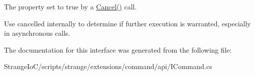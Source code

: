 The property set to true by a \hyperlink{interfacestrange_1_1extensions_1_1command_1_1api_1_1_i_command_afe6c708912de7fe65dbe44d1ba83b547}{Cancel()} call. 

Use cancelled internally to determine if further execution is warranted, especially in asynchronous calls. 

The documentation for this interface was generated from the following file\-:\begin{DoxyCompactItemize}
\item 
Strange\-Io\-C/scripts/strange/extensions/command/api/I\-Command.\-cs\end{DoxyCompactItemize}
